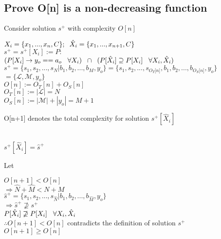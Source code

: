 \documentclass[11pt]{article}
\begin{document}
\subsection{Prove O[n] is a non-decreasing function}
Consider solution $s^+$ with complexity $O[n]$
\begin{center}
\vspace{1mm}
$
X_i = \{x_1,...,x_n,C\}; \hspace{2mm} \hat{X}_i = \{x_1,...,x_{n+1},C\}
$
\\ \vspace{2mm}
$
s^+ = s^+[X_i] := P :
$
\\ \vspace{2mm}
$
(P \lbrack X_i \rbrack \rightarrow y_{o} == a_{o} \hspace{3mm} \forall X_i) \hspace{2mm} \cap \hspace{2mm} (P[\hat{X}_i] \supseteq P[X_i] \hspace{3mm} \forall X_i,\hat{X}_i)
$
\\ \vspace{4mm}
$
s^+ = \{ s_1,s_2,...,s_N|b_1,b_2,...,b_M,y_o\} = \{ s_1,s_2,...,s_{O_T \lbrack n \rbrack }, b_1, b_2,...,b_{O_S \lbrack n \rbrack},y_o \}
$
\\ \vspace{2mm}
$
= \{ \mathcal{L},\mathcal{M},y_o\}
$
\\ \vspace{5mm}
$
O[n] := O_T[n] + O_S[n]
$
\\ \vspace{3mm}
$
O_T[n] := |\mathcal{L}| = N
$
\\ \vspace{2mm}
$
O_S[n] := |\mathcal{M}| + |y_o| = M + 1
$
\\ \vspace{6mm}
\end{center}
O[n+1] denotes the total complexity for solution $s^+[\hat{X}_i]$\\\\
\begin{center}
$
s^+[\hat{X}_i] = \hat{s}^+
$
\end{center}
Let
\begin{center}
$
O[n+1] < O[n]
$
\\ \vspace{2mm}
$
\Rightarrow \hat{N} + \hat{M} < N + M
$
\\ \vspace{2mm}
$
\hat{s}^+ = \{ s_1,s_2,...,s_{\hat{N}}|b_1,b_2,...,b_{\hat{M}},y_o\}
$
\\ \vspace{6mm}
$
\Rightarrow \hat{s}^+ \not \supseteq s^+
$
\\ \vspace{2mm}
$
P[\hat{X}_i] \not \supseteq P[X_i] \hspace{3mm} \forall X_i,\hat{X}_i
$
\\ \vspace{6mm}
$
\therefore O[n+1] < O[n]$ contradicts the definition of solution $s^+$
\\ \vspace{2mm}
$
O[n+1] \geq O[n]
$
\end{center}
\end{document}
